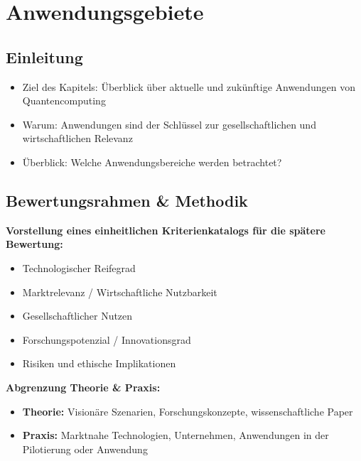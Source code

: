 \chapter{Anwendungsgebiete}
\label{applications} %




%
%


\section{Einleitung}
\begin{itemize}
    \item Ziel des Kapitels: Überblick über aktuelle und zukünftige Anwendungen von Quantencomputing
    \item Warum: Anwendungen sind der Schlüssel zur gesellschaftlichen und wirtschaftlichen Relevanz
    \item Überblick: Welche Anwendungsbereiche werden betrachtet?
\end{itemize}


\section{Bewertungsrahmen \& Methodik}
\textbf{Vorstellung eines einheitlichen Kriterienkatalogs für die spätere Bewertung:}
\begin{itemize}
    \item Technologischer Reifegrad
    \item Marktrelevanz / Wirtschaftliche Nutzbarkeit
    \item Gesellschaftlicher Nutzen
    \item Forschungspotenzial / Innovationsgrad
    \item Risiken und ethische Implikationen
\end{itemize}

\textbf{Abgrenzung Theorie \& Praxis:}
\begin{itemize}
    \item \textbf{Theorie:} Visionäre Szenarien, Forschungskonzepte, wissenschaftliche Paper
    \item \textbf{Praxis:} Marktnahe Technologien, Unternehmen, Anwendungen in der Pilotierung oder Anwendung
\end{itemize}


